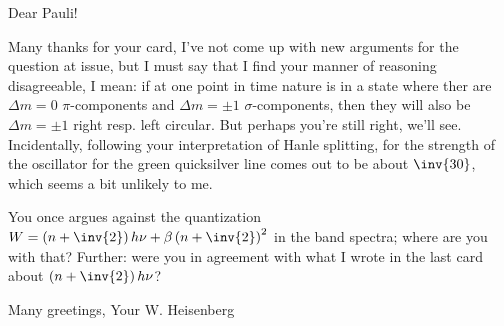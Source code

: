 \date{July 4, 1925}

Dear Pauli!

Many thanks for your card, I've not come up with new arguments for the question at issue, but I must say that I find your manner of reasoning disagreeable, I mean: if at one point in time nature is in a state where ther are $\Delta m = 0$ $\pi$-components and $\Delta m = \pm 1$ $\sigma$-components, then they will also be $\Delta m = \pm 1$ right resp. left circular. But perhaps you're still right, we'll see. Incidentally, following your interpretation of Hanle splitting, for the strength of the oscillator for the green quicksilver line comes out to be about $\inv{30}$, which seems a bit unlikely to me.

You once argues against the quantization $W=\left(n+\inv{2}\right)h\nu + \beta\left(n+\inv{2}\right)^2$ in the band spectra; where are you with that? Further: were you in agreement with what I wrote in the last card about $\left(n+\inv{2}\right)h\nu$?

Many greetings,
Your W. Heisenberg
